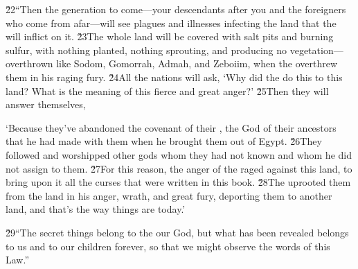 \v{22}``Then the generation to come---your descendants after you and the foreigners who come from afar---will see plagues and illnesses infecting the land that the  will inflict on it. \v{23}The whole land will be covered with salt pits and burning sulfur, with nothing planted, nothing sprouting, and producing no vegetation---overthrown like Sodom, Gomorrah, Admah, and Zeboiim, when the  overthrew them in his raging fury. \v{24}All the nations will ask, `Why did the  do this to this land? What is the meaning of this fierce and great anger?' \v{25}Then they will answer themselves,

\begin{poetry}
\poeml `Because they've abandoned the covenant of their , the God of their ancestors that he had made with them when he brought them out of Egypt. \v{26}They followed and worshipped other gods whom they had not known and whom he did not assign to them. \v{27}For this reason, the anger of the  raged against this land, to bring upon it all the curses that were written in this book. \v{28}The  uprooted them from the land in his anger, wrath, and great fury, deporting them to another land, and that's the way things are today.'
\end{poetry}

\v{29}``The secret things belong to the  our God, but what has been revealed belongs to us and to our children forever, so that we might observe the words of this Law.''

